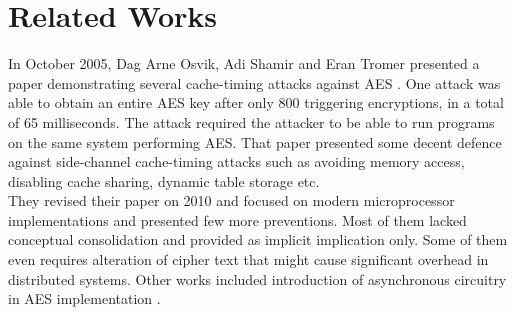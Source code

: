 \section{Related Works}

In October 2005, Dag Arne Osvik, Adi Shamir and Eran Tromer presented a paper demonstrating several cache-timing attacks against AES \cite{osvikold}. One attack was able to obtain an entire AES key after only 800 triggering encryptions, in a total of 65 milliseconds. The attack required the attacker to be able to run programs on the same system performing AES. That paper presented some decent defence against side-channel cache-timing attacks such as avoiding memory access, disabling cache sharing, dynamic table storage etc.\\

They revised their paper on 2010 \cite{osvik} and focused on modern microprocessor implementations and presented few more preventions. Most of them lacked conceptual consolidation and provided as implicit implication only. Some of them even requires alteration of cipher text that might cause significant overhead in distributed systems. Other works included introduction of asynchronous circuitry in AES implementation \cite{spadavecchia2006network}.\\
